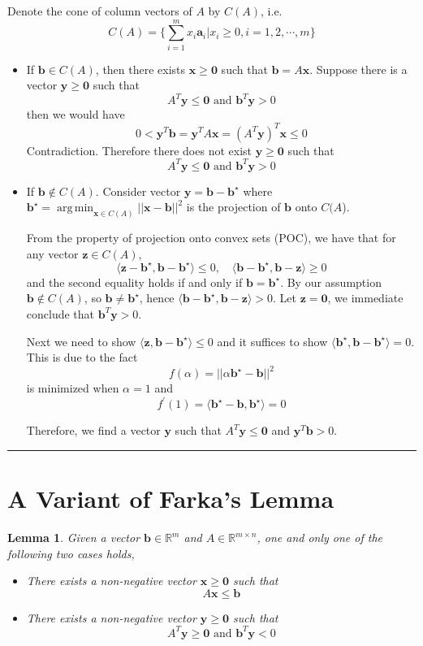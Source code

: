 \documentclass{article}
\DeclareMathOperator*{\argmin}{arg\,min}
\newcommand{\bs}{\boldsymbol}
\newtheorem{lemma}[theorem]{Lemma}
\newenvironment{proof}{{\bf Proof:}}{\hfill\rule{2mm}{2mm}}
\begin{document}
\begin{proof}
Denote the cone of column vectors of $A$ by $C(A)$, i.e.
	\[ C(A) = \{ \sum_{i=1}^m x_i \bs{a}_i| x_i \ge 0, i=1,2,\cdots, m\}\]
\begin{itemize}
	\item If $\bs{b} \in C(A)$, then there exists $\bs{x} \ge \bs{0}$ such that $\bs{b} = A\bs{x}$. Suppose there is a vector $\bs{y} \ge \bs{0}$ such that 
	\[ A^T\bs{y} \le \bs{0} \mbox{ and } \bs{b}^T \bs{y} > 0 \]
	then we would have 
	\[ 0 < \bs{y}^T\bs{b} = \bs{y}^T A\bs{x}=(A^T \bs{y})^T\bs{x} \le 0 \]
	Contradiction. Therefore there does not exist $\bs{y} \ge \bs{0}$ such that 
	\[ A^T\bs{y} \le \bs{0} \mbox{ and } \bs{b}^T \bs{y} > 0\]
	\item If $\bs{b} \notin C(A)$. Consider vector $\bs{y} = \bs{b} - \bs{b}^\star$ where $\displaystyle \bs{b}^\star = \argmin_{\bs{x} \in C(A)} ||\bs{x} - \bs{b}||^2$ is the projection of $\bs{b}$ onto $C(A$).

	From the property of projection onto convex sets (POC), we have that for any vector $\bs{z} \in C(A)$,
	\[  \langle \bs{z} - \bs{b}^\star, \bs{b} - \bs{b}^\star \rangle \le 0, \quad \langle \bs{b} - \bs{b}^\star, \bs{b} - \bs{z}\rangle \ge 0\]
	and the second equality holds if and only if $\bs{b} =\bs{b}^\star$. By our assumption $\bs{b} \notin C(A)$, so $\bs{b} \neq \bs{b}^\star$, hence $\langle \bs{b} - \bs{b}^\star, \bs{b} - \bs{z}\rangle > 0$. Let $\bs{z} =\bs{0}$, we immediate conclude that $\bs{b}^T\bs{y} > 0$.

	Next we need to show $\langle \bs{z}, \bs{b} - \bs{b}^\star \rangle \le 0$ and it suffices to show $\langle \bs{b}^\star, \bs{b} - \bs{b}^\star\rangle =0$. This is due to the fact 
	\[ f(\alpha) = ||\alpha \bs{b}^\star - \bs{b}||^2 \]
	is minimized when $\alpha = 1$ and 
	\[f^\prime(1) = \langle \bs{b}^\star-\bs{b}, \bs{b}^\star \rangle = 0\]

	Therefore, we find a vector $\bs{y}$ such that $A^T\bs{y} \le \bs{0}$ and $\bs{y}^T\bs{b} > 0$.
\end{itemize}
\end{proof}

\section{A Variant of Farka's Lemma}
\begin{lemma}
Given a vector $\bs{b} \in \mathbb{R}^m$  and $A \in \mathbb{R}^{m \times n}$, one and only one of the following two cases holds,
\begin{itemize}
	\item There exists a non-negative vector $\bs{x} \ge \bs{0}$ such that 
		\[ A\bs{x} \le \bs{b} \]
	\item There exists a non-negative vector $\bs{y} \ge \bs{0}$ such that
		\[ A^T\bs{y} \ge \bs{0} \mbox{ and } \bs{b}^T\bs{y} < 0 \]
\end{itemize}
\end{lemma}
\end{document}

